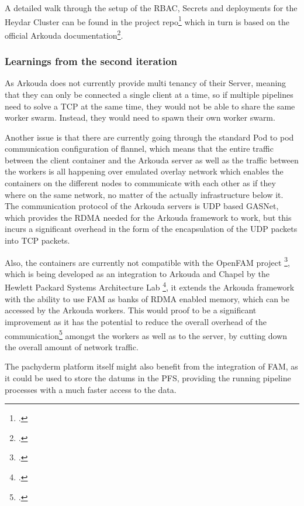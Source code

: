 A detailed walk through the setup of the \ac{RBAC}, Secrets and deployments for the Heydar Cluster can be found in the project repo\footcite{HeydarSetup} which in turn is based on the official
Arkouda documentation\footcite{ArkoudacontribArkoudadockerMain}.

\subsubsection*{Learnings from the second iteration}
As Arkouda does not currently provide multi tenancy of their Server, meaning that they can only be connected a single client at a time, 
so if multiple pipelines need to solve a \ac{TCP} at the same time, they would not be able to share the same worker swarm.
Instead, they would need to spawn their own worker swarm.

Another issue is that there are currently going through the standard Pod to pod communication configuration of flannel, which means that the entire traffic between the client container and the Arkouda server 
as well as the traffic between the workers is all happening over emulated overlay network which enables the containers on the different nodes to communicate with each other as if they where on the same network, no matter of the actually infrastructure below it.
The communication protocol of the Arkouda servers is \ac{UDP} based \ac{GASNet}, which provides the \ac{RDMA} needed for the Arkouda framework to work, but this incurs a significant overhead in the form of the encapsulation of the \ac{UDP} packets into \ac{TCP} packets.

Also, the containers are currently not compatible with the OpenFAM project \footcite{keetonOpenFAMAPIProgramming2019}, which is being developed as an integration to Arkouda and Chapel by the Hewlett Packard Systems Architecture Lab \footcite{byrneCouplingChapelPoweredHPC2023},
it extends the Arkouda framework with the ability to use \ac{FAM} as banks of \ac{RDMA} enabled memory, which can be accessed by the Arkouda workers.
This would proof to be a significant improvement as it has the potential to reduce the overall overhead of the communication\Footcite{chouOptimizingPostCopyLive2019} amongst the workers as well as to the server, by cutting down the overall amount of network traffic.

The pachyderm platform itself might also benefit from the integration of \ac{FAM}, as it could be used to store the datums in the \ac{PFS}, providing the running pipeline processes with a much faster access to the data.

